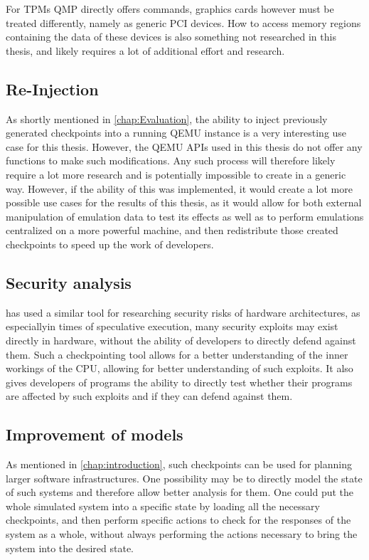 For TPMs QMP directly offers commands, graphics cards however must be treated differently, namely as generic PCI devices.
How to access memory regions containing the data of these devices is also something not researched in this thesis,
and likely requires a lot of additional effort and research.

\subsection{Re-Injection}\label{sec:injection}
As shortly mentioned in \autoref{chap:Evaluation},
the ability to inject previously generated checkpoints into a running QEMU instance is a very interesting use case for this thesis.
However, the QEMU APIs used in this thesis do not offer any functions to make such modifications.
Any such process will therefore likely require a lot more research and is potentially impossible to create in a generic way.
However, if the ability of this was implemented,
it would create a lot more possible use cases for the results of this thesis,
as it would allow for both external manipulation of emulation data to test its effects
as well as to perform emulations centralized on a more powerful machine,
and then redistribute those created checkpoints to speed up the work of developers.

\subsection{Security analysis}
 has used a similar tool for researching security risks of hardware architectures,
as especiallyin times of speculative execution,
many security exploits may exist directly in hardware,
without the ability of developers to directly defend against them\cite{lapidary}.
Such a checkpointing tool allows for a better understanding of the inner workings of the CPU,
allowing for better understanding of such exploits.
It also gives developers of programs the ability to directly test whether their programs
are affected by such exploits and if they can defend against them.

\subsection{Improvement of models}
As mentioned in \autoref{chap:introduction},
such checkpoints can be used for planning larger software infrastructures.
One possibility may be to directly model the state of such systems
and therefore allow better analysis for them.
One could put the whole simulated system into a specific state by loading all the necessary checkpoints,
and then perform specific actions to check for the responses of the system as a whole,
without always performing the actions necessary to bring the system into the desired state.

